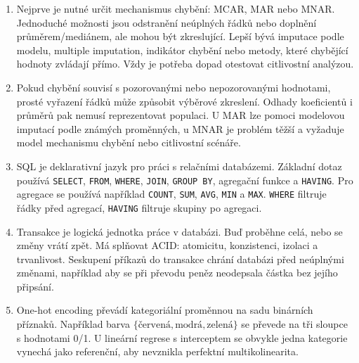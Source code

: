 \documentclass[12pt,a4paper]{article}
\begin{document}
\begin{enumerate}
  \item {}

  Nejprve je nutné určit mechanismus chybění: MCAR, MAR nebo MNAR. Jednoduché možnosti jsou odstranění
  neúplných řádků nebo doplnění průměrem/mediánem, ale mohou být zkreslující. Lepší bývá imputace
  podle modelu, multiple imputation, indikátor chybění nebo metody, které chybějící hodnoty zvládají
  přímo. Vždy je potřeba dopad otestovat citlivostní analýzou.

  \item {}

  Pokud chybění souvisí s pozorovanými nebo nepozorovanými hodnotami, prosté vyřazení řádků může
  způsobit výběrové zkreslení. Odhady koeficientů i průměrů pak nemusí reprezentovat populaci. U MAR
  lze pomoci modelovou imputací podle známých proměnných, u MNAR je problém těžší a vyžaduje model
  mechanismu chybění nebo citlivostní scénáře.

  \item {}

  SQL je deklarativní jazyk pro práci s relačními databázemi. Základní dotaz používá \texttt{SELECT},
  \texttt{FROM}, \texttt{WHERE}, \texttt{JOIN}, \texttt{GROUP BY}, agregační funkce a \texttt{HAVING}.
  Pro agregace se používá například \texttt{COUNT}, \texttt{SUM}, \texttt{AVG}, \texttt{MIN} a
  \texttt{MAX}. \texttt{WHERE} filtruje řádky před agregací, \texttt{HAVING} filtruje skupiny po
  agregaci.

  \item {}

  Transakce je logická jednotka práce v databázi. Buď proběhne celá, nebo se změny vrátí zpět. Má
  splňovat ACID: atomicitu, konzistenci, izolaci a trvanlivost. Seskupení příkazů do transakce chrání
  databázi před neúplnými změnami, například aby se při převodu peněz neodepsala částka bez jejího
  připsání.

  \item {}

  One-hot encoding převádí kategoriální proměnnou na sadu binárních příznaků. Například barva
  \(\{\text{červená}, \text{modrá}, \text{zelená}\}\) se převede na tři sloupce s hodnotami 0/1.
  U lineární regrese s interceptem se obvykle jedna kategorie vynechá jako referenční, aby nevznikla
  perfektní multikolinearita.


\end{enumerate}
\end{document}
